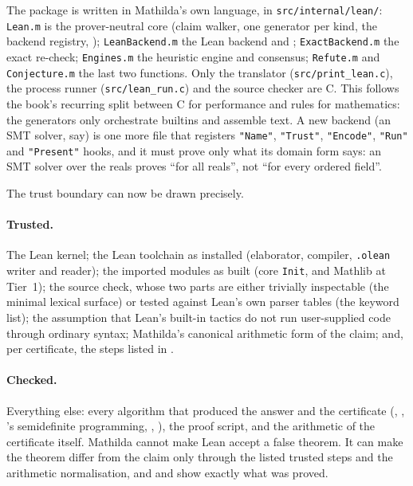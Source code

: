 The package is written in Mathilda's own language, in \texttt{src/internal/lean/}:
\texttt{Lean.m} is the prover-neutral core (claim walker, one generator per kind, the
backend registry, ); \texttt{LeanBackend.m} the Lean backend and
; \texttt{ExactBackend.m} the exact re-check; \texttt{Engines.m} the
heuristic engine and consensus; \texttt{Refute.m} and \texttt{Conjecture.m} the last two
functions. Only the translator  (\texttt{src/print\_lean.c}), the
process runner (\texttt{src/lean\_run.c}) and the source checker are C. This follows
the book's recurring split between C for performance and rules for mathematics: the
generators only orchestrate builtins and assemble text. A new backend (an SMT solver,
say) is one more file that registers \texttt{"Name"}, \texttt{"Trust"},
\texttt{"Encode"}, \texttt{"Run"} and \texttt{"Present"} hooks, and it must prove only
what its domain form says: an SMT solver over the reals proves ``for all reals'', not
``for every ordered field''.

The trust boundary can now be drawn precisely.

\paragraph{Trusted.} The Lean kernel; the Lean toolchain as installed (elaborator,
compiler, \texttt{.olean} writer and reader); the imported modules as built (core
\texttt{Init}, and Mathlib at Tier~1); the source check, whose two parts are either
trivially inspectable (the minimal lexical surface) or tested against Lean's own
parser tables (the keyword list); the assumption that Lean's built-in tactics do not
run user-supplied code through ordinary syntax; Mathilda's canonical arithmetic form
of the claim; and, per certificate, the steps listed in .

\paragraph{Checked.} Everything else: every algorithm that produced the answer and
the certificate (, , 's semidefinite programming,
, ), the proof script, and the arithmetic of the
certificate itself. Mathilda cannot make Lean accept a false theorem. It can make the
theorem differ from the claim only through the listed trusted steps and the
arithmetic normalisation, and  and  show exactly
what was proved.%

